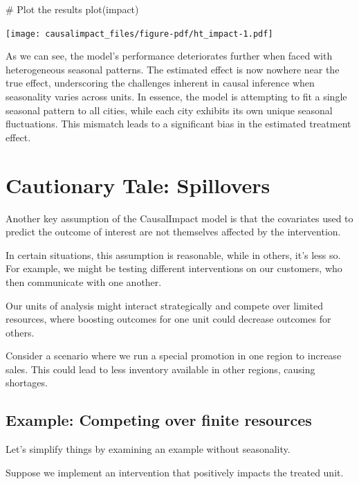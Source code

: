 \documentclass[
  letterpaper,
  DIV=11,
  numbers=noendperiod]{scrreprt}
\newenvironment{Shaded}{\begin{snugshade}}{\end{snugshade}}
\newcommand{\CommentTok}[1]{\textcolor[rgb]{0.37,0.37,0.37}{#1}}
\newcommand{\FunctionTok}[1]{\textcolor[rgb]{0.28,0.35,0.67}{#1}}
\newcommand{\NormalTok}[1]{\textcolor[rgb]{0.00,0.23,0.31}{#1}}
\begin{document}
\begin{Shaded}
\begin{Highlighting}[]
\CommentTok{\# Plot the results}
\FunctionTok{plot}\NormalTok{(impact)}
\end{Highlighting}
\end{Shaded}

\texttt{[image: causalimpact\_files/figure-pdf/ht\_impact-1.pdf]}

As we can see, the model's performance deteriorates further when faced
with heterogeneous seasonal patterns. The estimated effect is now
nowhere near the true effect, underscoring the challenges inherent in
causal inference when seasonality varies across units. In essence, the
model is attempting to fit a single seasonal pattern to all cities,
while each city exhibits its own unique seasonal fluctuations. This
mismatch leads to a significant bias in the estimated treatment effect.

\section{Cautionary Tale: Spillovers}\label{cautionary-tale-spillovers}

Another key assumption of the CausalImpact model is that the covariates
used to predict the outcome of interest are not themselves affected by
the intervention.

In certain situations, this assumption is reasonable, while in others,
it's less so. For example, we might be testing different interventions
on our customers, who then communicate with one another.

Our units of analysis might interact strategically and compete over
limited resources, where boosting outcomes for one unit could decrease
outcomes for others.

Consider a scenario where we run a special promotion in one region to
increase sales. This could lead to less inventory available in other
regions, causing shortages.

\subsection{Example: Competing over finite
resources}\label{example-competing-over-finite-resources}

Let's simplify things by examining an example without seasonality.

Suppose we implement an intervention that positively impacts the treated
unit.
\end{document}
